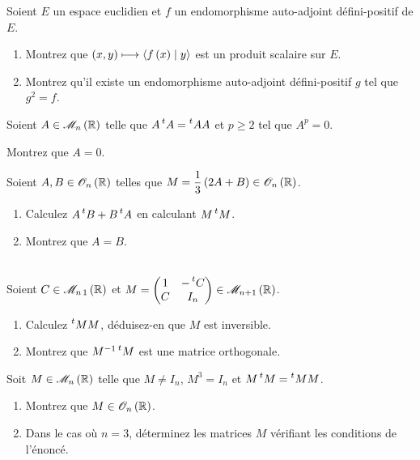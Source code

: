 \begin{exo}
Soient \(E\) un espace euclidien et \(f\) un endomorphisme auto-adjoint défini-positif de \(E\).

\begin{enumerate}
    \item Montrez que \(\left(x,y\right)\longmapsto\left\langle f\left(x\right)\;\middle|\; y\right\rangle\) est un produit scalaire sur \(E\). \\
    \item Montrez qu'il existe un endomorphisme auto-adjoint défini-positif \(g\) tel que \(g^2=f\).
\end{enumerate}
\end{exo}

\begin{exo}
Soient \(A\in\M{n}[\R]\) telle que \(A\prescript{t}{}{A}=\prescript{t}{}{A}A\) et \(p\geq2\) tel que \(A^p=0\).

Montrez que \(A=0\).
\end{exo}

\begin{exo}
Soient \(A,B\in\Orth{n}[\R]\) telles que \(M=\dfrac{1}{3}\paren{2A+B}\in\Orth{n}[\R]\).

\begin{enumerate}
    \item Calculez \(A\prescript{t}{}{B}+B\prescript{t}{}{A}\) en calculant \(M\prescript{t}{}{M}\). \\
    \item Montrez que \(A=B\).
\end{enumerate}
\end{exo}

\begin{exo}~\\
Soient \(C\in\M{n\,1}[\R]\) et \(M=\begin{pmatrix}
1 & -\trans{C} \\
C & I_n
\end{pmatrix}\in\M{n+1}[\R]\).

\begin{enumerate}
    \item Calculez \(\prescript{t}{}{M}M\), déduisez-en que \(M\) est inversible. \\
    \item Montrez que \(M^{-1}\prescript{t}{}{M}\) est une matrice orthogonale.
\end{enumerate}
\end{exo}

\begin{exo}
Soit \(M\in\M{n}[\R]\) telle que \(M\not=I_n\), \(M^3=I_n\) et \(M\prescript{t}{}{M}=\prescript{t}{}{M}M\).

\begin{enumerate}
    \item Montrez que \(M\in\Orth{n}[\R]\). \\
    \item Dans le cas où \(n=3\), déterminez les matrices \(M\) vérifiant les conditions de l'énoncé.
\end{enumerate}
\end{exo}

